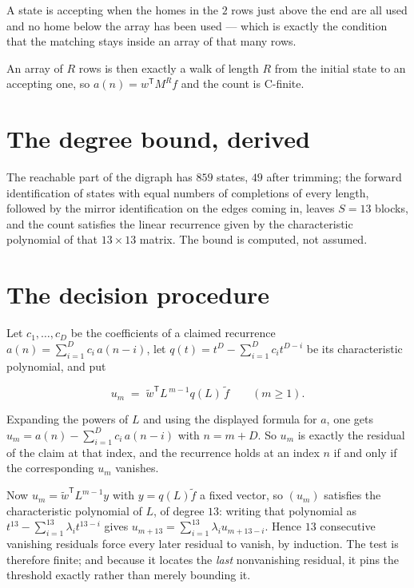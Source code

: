 \documentclass[11pt]{article}
\theoremstyle{definition}
\begin{document}
A state is accepting when the homes in the $2$ rows just above the end are all used and no home below the array has been used --- which is exactly the condition that the matching stays inside an array of that many rows.

An array of $R$ rows is then exactly a walk of length $R$ from the initial state to an accepting one, so $a(n) = w^{\mathsf T}M^{R}f$ and the count is C-finite.

\section{The degree bound, derived}

The reachable part of the digraph has $859$ states, $49$ after trimming; the forward identification of states with equal numbers of completions of every length, followed by the mirror identification on the edges coming in, leaves $S = 13$ blocks, and the count satisfies the linear recurrence given by the characteristic polynomial of that $13\times13$ matrix. The bound is computed, not assumed.

\section{The decision procedure}

Let $c_1,\dots,c_D$ be the coefficients of a claimed recurrence $a(n) = \sum_{i=1}^{D} c_i\,a(n-i)$, let $q(t) = t^{D} - \sum_{i=1}^{D} c_i t^{D-i}$ be its characteristic polynomial, and put

\[u_m \;=\; \tilde w^{\mathsf T} L^{\,m-1} q(L)\,\tilde f \qquad (m \ge 1).\]

Expanding the powers of $L$ and using the displayed formula for $a$, one gets $u_m = a(n) - \sum_{i=1}^{D} c_i\,a(n-i)$ with $n = m + D$. So $u_m$ is exactly the residual of the claim at that index, and the recurrence holds at an index $n$ if and only if the corresponding $u_m$ vanishes.

Now $u_m = \tilde w^{\mathsf T} L^{m-1} y$ with $y = q(L)\tilde f$ a fixed vector, so $(u_m)$ satisfies the characteristic polynomial of $L$, of degree $13$: writing that polynomial as $t^{13} - \sum_{i=1}^{13} \lambda_i t^{13-i}$ gives $u_{m+13} = \sum_{i=1}^{13} \lambda_i u_{m+13-i}$. Hence $13$ consecutive vanishing residuals force every later residual to vanish, by induction. The test is therefore finite; and because it locates the {\itshape last} nonvanishing residual, it pins the threshold exactly rather than merely bounding it.
\end{document}
